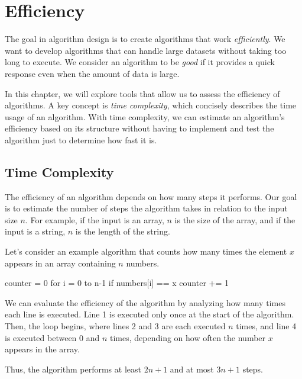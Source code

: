 \chapter{Efficiency}

The goal in algorithm design is to create algorithms that work \emph{efficiently}. We want to develop algorithms that can handle large datasets without taking too long to execute. We consider an algorithm to be \emph{good} if it provides a quick response even when the amount of data is large.

In this chapter, we will explore tools that allow us to assess the efficiency of algorithms. A key concept is \emph{time complexity}, which concisely describes the time usage of an algorithm. With time complexity, we can estimate an algorithm's efficiency based on its structure without having to implement and test the algorithm just to determine how fast it is.

\section{Time Complexity}


The efficiency of an algorithm depends on how many steps it performs. Our goal is to estimate the number of steps the algorithm takes in relation to the input size $n$. For example, if the input is an array, $n$ is the size of the array, and if the input is a string, $n$ is the length of the string.

Let’s consider an example algorithm that counts how many times the element $x$ appears in an array containing $n$ numbers.

\begin{code}[numbers=left]
    counter = 0
    for i = 0 to n-1
    if numbers[i] == x
    counter += 1
\end{code}

We can evaluate the efficiency of the algorithm by analyzing how many times each line is executed. Line 1 is executed only once at the start of the algorithm. Then, the loop begins, where lines 2 and 3 are each executed $n$ times, and line 4 is executed between $0$ and $n$ times, depending on how often the number $x$ appears in the array.

Thus, the algorithm performs at least $2n+1$ and at most $3n+1$ steps.



